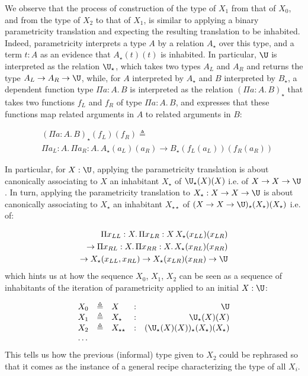 \documentclass[10pt]{art.cls/art}
\newcommand{\defeq}{\ensuremath{\triangleq}}
\newcommand{\kstar}{{\star}}
\begin{document}
We observe that the process of construction of the type of $X_1$ from that of $X_0$, and from the type of $X_2$ to that of $X_1$, is similar to applying a binary parametricity translation and expecting the resulting translation to be inhabited. Indeed, parametricity interprets a type $A$ by a relation $A_\kstar$ over this type, and a term $t: A$ as an evidence that $A_\kstar(t)(t)$ is inhabited. In particular, $\U$ is interpreted as the relation ${\U}_\kstar$, which takes two types $A_L$ and $A_R$ and returns the type $A_L \rightarrow A_R \rightarrow \U$, while, for $A$ interpreted by $A_\kstar$ and $B$ interpreted by $B_\kstar$, a dependent function type $\Pi a: A.\, B$ is interpreted as the relation $(\Pi a: A.\, B)_\kstar$ that takes two functions $f_L$ and $f_R$ of type $\Pi a: A.\, B$, and expresses that these functions map related arguments in $A$ to related arguments in $B$:

\begin{align*}
   & (\Pi a: A.\, B)_\kstar(f_L)(f_R) \defeq                                                 \\
   & \Pi a_L: A.\, \Pi a_R: A.\, A_\kstar(a_L)(a_R) \rightarrow B_\kstar(f_L(a_L))(f_R(a_R))
\end{align*}

In particular, for $X: \U$, applying the parametricity translation is about canonically associating to $X$ an inhabitant $X_\kstar$ of ${\U}_\kstar(X)(X)$ i.e. of $X \rightarrow X \rightarrow \U$. In turn, applying the parametricity translation to $X_\kstar: X \rightarrow X \rightarrow \U$ is about canonically associating to $X_\kstar$ an inhabitant $X_{\kstar\kstar}$ of $(X \rightarrow X \rightarrow \U)_\kstar(X_\kstar)(X_\kstar)$ i.e. of:

\begin{align*}
  \Pi x_{LL}: X.\, \Pi x_{LR}: X\, X_\kstar(x_{LL})(x_{LR})              \\
  \rightarrow \Pi x_{RL}: X.\, \Pi x_{RR}: X.\, X_\kstar(x_{RL})(x_{RR}) \\ \rightarrow X_\kstar(x_{LL}, x_{RL}) \rightarrow X_\kstar(x_{LR})(x_{RR})  \rightarrow \U
\end{align*}
which hints us at how the sequence $X_0$, $X_1$, $X_2$ can be seen as a sequence of inhabitants of the iteration of parametricity applied to an initial $X: \U$:

\begin{equation*}
  \begin{array}{llllr}
    X_0 & \defeq & X                & : & \U                                               \\
    X_1 & \defeq & X_\kstar         & : & {\U}_\kstar(X)(X)                                \\
    X_2 & \defeq & X_{\kstar\kstar} & : & ({\U}_\kstar(X)(X))_{\kstar}(X_\kstar)(X_\kstar) \\
    \ldots
  \end{array}
\end{equation*}
This tells us how the previous (informal) type given to $X_2$ could be rephrased so that it comes as the instance of a general recipe characterizing the type of all $X_i$.
\end{document}

